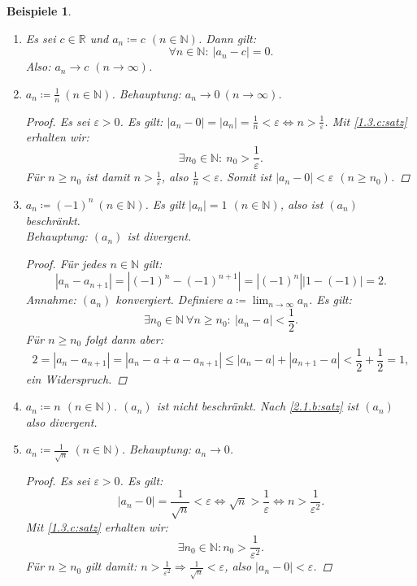 \documentclass[12pt]{extreport} %
\newcommand{\N}{\mathbb{N}}
\newcommand{\R}{\mathbb{R}}
\theoremstyle{named}
\theoremstyle{itshape}
\theoremstyle{normal}
\newtheorem*{beispiele}{Beispiele}
\begin{document}
\begin{beispiele}\
	\begin{enumerate}
		\item Es sei $c \in \R$ und $a_{n} \coloneqq c$ $(n \in \N)$. Dann gilt:
			$$
				\forall n \in \N: ~ | a_{n} - c | = 0.
			$$
			Also: $a_{n} \rightarrow c$ $(n \to \infty)$.
		\item $a_{n} \coloneqq \frac{1}{n} ~(n \in \N)$. Behauptung: $a_{n} \rightarrow 0 ~(n \rightarrow \infty)$.
			\begin{proof}
				Es sei $\varepsilon > 0$. Es gilt: $|a_{n} - 0 | = |a_{n}| = \frac{1}{n} < \varepsilon \iff n > \frac{1}{\varepsilon}$. Mit
				\ref{1.3.c:satz} erhalten wir:
				$$
						\exists n_{0} \in \N: ~ n_{0} > \frac{1}{\varepsilon}.
				$$
				Für $n \geq n_{0}$ ist damit $n > \frac{1}{\varepsilon}$, also $\frac{1}{n} < \varepsilon$. Somit ist
				$|a_{n} - 0| < \varepsilon$ $(n \geq n_{0})$.
			\end{proof}
		\item $a_{n} \coloneqq (-1)^{n} ~(n \in \N)$. Es gilt $|a_{n}| = 1$ $(n \in \N)$, also ist $(a_{n})$ beschränkt. \\
		      Behauptung: $(a_{n})$ ist divergent.
			\begin{proof}
				Für jedes $n \in \N$ gilt: 
				$$ |a_{n} - a_{n+1}| = |(-1)^{n} - (-1)^{n+1}| = |(-1)^{n}|| 1 - (-1) | = 2. $$
				Annahme: $(a_{n})$ konvergiert. Definiere $a \coloneqq \lim_{n \to \infty} a_{n}$. Es gilt:
				$$
					 \exists n_{0} \in \N ~ \forall n \geq n_{0}: ~ |a_{n} - a| < \frac{1}{2}. 
				$$
				Für $n \geq n_{0}$ folgt dann aber:
				$$
					2 = |a_{n} - a_{n+1}| = |a_{n} - a + a - a_{n + 1}| \leq |a_{n} - a| + |a_{n+1} - a| < \frac{1}{2} + \frac{1}{2} = 1,
				$$
				ein Widerspruch.
			\end{proof}
		\item $a_{n} \coloneqq n$ $(n \in \N)$. $(a_{n})$ ist nicht beschränkt. Nach \ref{2.1.b:satz} ist $(a_{n})$ also divergent.
		\item $a_{n} \coloneqq  \frac{1}{\sqrt{n}}$ $(n \in \N)$. Behauptung: $a_{n} \rightarrow 0$.
			\begin{proof}
				Es sei $\varepsilon > 0$. Es gilt:
				$$
					|a_{n} - 0| = \frac{1}{\sqrt{n}} < \varepsilon \iff \sqrt{n} > \frac{1}{\varepsilon} \iff n > \frac{1}{\varepsilon^{2}}.
				$$
				Mit {\ref{1.3.c:satz}} erhalten wir: $$\exists n_{0} \in \N: n_{0} > \frac{1}{\varepsilon^{2}}.$$
				Für $n \geq n_{0}$ gilt damit: $n > \frac{1}{\varepsilon^{2}} \Rightarrow \frac{1}{\sqrt{n}} < \varepsilon$, also $|a_{n} - 0 | < \varepsilon$. 

\end{proof}
\end{enumerate}
\end{beispiele}
\end{document}
